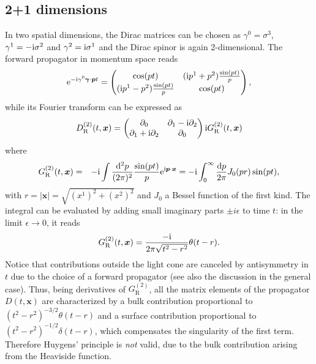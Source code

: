 \subsection{2+1 dimensions}
\label{sec:21dim}
In two spatial dimensions, the Dirac matrices can be chosen as $\gamma^0=\sigma^3$, $\gamma^1=-\mathrm{i}\sigma^2$ and $\gamma^2=\mathrm{i}\sigma^1$
and the Dirac spinor is again 2-dimensional. The forward propagator in momentum space reads
\begin{equation}
\mathrm{e}^{-\mathrm{i}\gamma^0 \bm{\gamma}\cdot\bm{p} t} = \left( \begin{matrix} \cos(pt) & (\mathrm{i} p^1 + p^2) \frac{\sin(pt)}{p} \\ (\mathrm{i} p^1 - p^2) \frac{\sin(pt)}{p} & \cos(pt) \end{matrix}  \right) ,
\end{equation} 
while its Fourier transform can be expressed as
\begin{equation}
D_{\textrm{R}}^{(2)}(t,\bm{x}) = \left( \begin{matrix} \partial_0 & \partial_1 - \mathrm{i} \partial_2  \\ \partial_1 + \mathrm{i} \partial_2 & \partial_0 \end{matrix}  \right) \mathrm{i} G_\textrm{R}^{(2)}(t,\bm{x})
\end{equation}
where 
\begin{eqnarray}
G_\textrm{R}^{(2)} (t,\bm{x}) & = & -\mathrm{i} \int \frac{\mathrm{d}^2p}{(2\pi)^2} \frac{\sin(pt)}{p} \mathrm{e}^{\mathrm{i}\bm{p}\cdot\bm{x}}  =  -\mathrm{i} \int_0^{\infty} \frac{\mathrm{d} p}{2\pi} J_0(pr) \sin(pt),
\end{eqnarray}
with $r=|\bm{x}|=\sqrt{(x^1)^2+(x^2)^2}$ and $J_0$ a Bessel function of the first kind. The integral can be evaluated by adding small imaginary parts $\pm i\epsilon$ to time $t$: in the limit $\epsilon\to 0$, it reads
\begin{equation}
G_\textrm{R}^{(2)} (t,\bm{x}) = \frac{-\mathrm{i}}{2\pi \sqrt{t^2-r^2}} \theta (t-r).
\label{GR2}
\end{equation}
Notice that contributions outside the light cone are canceled by antisymmetry in $t$ due to the choice of a forward propagator (see also the discussion in the general case). Thus, being derivatives of $G_\textrm{R}^{(2)}$, all the matrix elements of the propagator $D(t,\bm{x})$ are characterized by a bulk contribution proportional to $(t^2-r^2)^{-3/2}\theta(t-r)$ and a surface contribution proportional to $(t^2-r^2)^{-1/2}\delta(t-r)$, which compensates the singularity of the first term.
Therefore Huygens' principle is \emph{not} valid, due to the bulk contribution arising from the Heaviside function.


